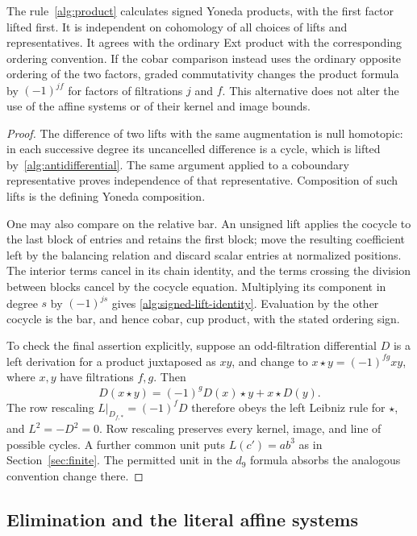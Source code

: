 \begin{lemma}\label{alg:product-conventions}
The rule~\eqref{alg:product} calculates signed Yoneda products, with
the first factor lifted first.  It is independent on cohomology of all
choices of lifts and representatives.  It agrees with the ordinary Ext
product with the corresponding ordering convention.  If the cobar
comparison instead uses the ordinary opposite ordering of the two
factors, graded commutativity changes the product formula by
$(-1)^{jf}$ for factors of filtrations $j$ and $f$.
This alternative does not alter the use of the affine
systems or of their kernel and image bounds.
\end{lemma}

\begin{proof}
The difference of two lifts with the same augmentation is null
homotopic: in each successive degree its uncancelled difference is a
cycle, which is lifted by~\eqref{alg:antidifferential}.  The same
argument applied to a coboundary representative proves independence
of that representative.  Composition of such lifts is the defining
Yoneda composition.

One may also compare on the relative bar.  An unsigned lift applies
the cocycle to the last block of entries and retains the first block;
move the resulting coefficient left by the balancing relation and
discard scalar entries at normalized positions.  The interior terms
cancel in its chain identity, and the terms crossing the division
between blocks cancel by the cocycle equation.  Multiplying its
component in degree $s$ by $(-1)^{js}$ gives
\eqref{alg:signed-lift-identity}.  Evaluation by the other cocycle is
the bar, and hence cobar, cup product, with the stated ordering sign.

To check the final assertion explicitly, suppose an odd-filtration
differential $D$ is a left derivation for a product juxtaposed as $xy$,
and change to $x\star y=(-1)^{fg}xy$, where $x,y$ have filtrations
$f,g$.  Then
\[
 D(x\star y)=(-1)^gD(x)\star y+x\star D(y).
\]
The row rescaling $L|_{D_{f,*}}=(-1)^fD$ therefore obeys the left
Leibniz rule for $\star$, and $L^2=-D^2=0$.  Row rescaling preserves
every kernel, image, and line of possible cycles.  A further common
unit puts $L(c')=ab^3$ as in Section~\ref{sec:finite}.
The permitted unit in the $d_9$ formula absorbs the analogous convention
change there.
\end{proof}

\subsection{Elimination and the literal affine systems}

